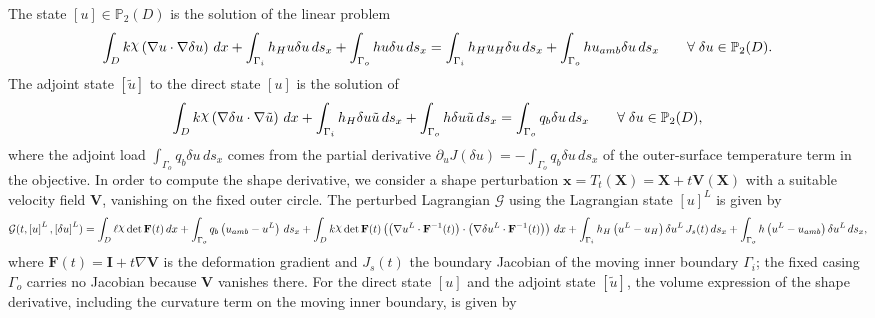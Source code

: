 \documentclass[preview]{standalone}
\let\oldcdot\cdot
\let\cdot\oldcdot
\begin{document}
The state $\left[ u\right] \in \mathbb P_{2}(D)$ is the solution of the linear problem
\begin{dmath*}
\int_{D} k \raisebox{\depth}{$\chi$} \left(  \nabla u  \cdot  \nabla \delta u  \right) \,dx + \int_{\Gamma_i} h_H u \delta u \,ds_x + \int_{\Gamma_o} h u \delta u \,ds_x = \int_{\Gamma_i} h_H u_{H} \delta u \,ds_x + \int_{\Gamma_o} h u_{amb} \delta u \,ds_x \qquad \forall\; {\delta u\in \mathbb P_{2}(D)} .
\end{dmath*}
The adjoint state $\left[ \tilde u\right]$ to the direct state $\left[ u\right]$ is the solution of
\begin{dmath*}
\int_{D} k \raisebox{\depth}{$\chi$} \left(  \nabla \delta u  \cdot  \nabla \tilde u  \right) \,dx + \int_{\Gamma_i} h_H \delta u \tilde u \,ds_x + \int_{\Gamma_o} h \delta u \tilde u \,ds_x = \int_{\Gamma_o} q_b \delta u \,ds_x \qquad \forall\; {\delta u\in \mathbb P_{2}(D)} ,
\end{dmath*}
where the adjoint load $\int_{\Gamma_o} q_b \delta u \,ds_x$ comes from the partial derivative $\partial_{u} J(\delta u) = - \int_{\Gamma_o} q_b \delta u \,ds_x$ of the outer-surface temperature term in the objective.
In order to compute the shape derivative, we consider a shape perturbation $\mathbf x = T_t(\mathbf X) = \mathbf X + t \mathbf  V(\mathbf X)$ with a suitable velocity field $\mathbf V$, vanishing on the fixed outer circle.  The perturbed Lagrangian $\mathcal G$ using the Lagrangian state $\left[ u\right]^{L}$ is given by
\begin{dmath*}
\mathcal G(t,\left[ u\right]^{L},\left[ \delta u\right]^{L}) = \int_{D} \ell \raisebox{\depth}{$\chi$}  \operatorname{det}\mathbf F( t )  \,dx + \int_{\Gamma_o} q_b \left( u_{amb} - u^{L}\right) \,ds_x +  \int_{D} k \raisebox{\depth}{$\chi$}  \operatorname{det}\mathbf F( t )  \left( \left(  \nabla u^{L} \cdot  \mathbf F^{-1}(t) \right) \cdot \left(  \nabla \delta u^{L} \cdot  \mathbf F^{-1}(t) \right) \right) \,dx + \int_{\Gamma_i} h_H \left( u^{L} - u_{H}\right) \delta u^{L} \,J_{s}(t) \,ds_x + \int_{\Gamma_o} h \left( u^{L} - u_{amb}\right) \delta u^{L} \,ds_x ,
\end{dmath*}
where $\mathbf F(t) = \mathbf I + t \nabla \mathbf V$ is the deformation gradient and $J_{s}(t)$ the boundary Jacobian of the moving inner boundary $\Gamma_i$; the fixed casing $\Gamma_o$ carries no Jacobian because $\mathbf V$ vanishes there.
For the direct state $\left[ u\right]$ and the adjoint state $\left[ \tilde u\right]$, the volume expression of the shape derivative, including the curvature term on the moving inner boundary, is given by
\end{document}
